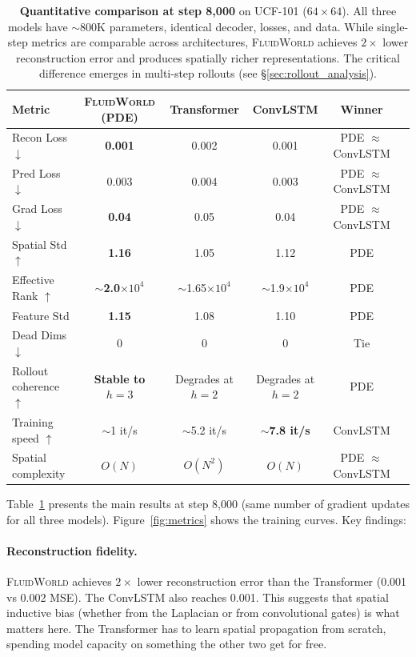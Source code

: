 \documentclass{article}
\newcommand{\fluidworld}{\textsc{FluidWorld}}
\begin{document}
\begin{table}[t]
    \centering
    \caption{\textbf{Quantitative comparison at step 8,000} on UCF-101 ($64\!\times\!64$). All three models have $\sim$800K parameters, identical decoder, losses, and data. While single-step metrics are comparable across architectures, \fluidworld{} achieves $2\times$ lower reconstruction error and produces spatially richer representations. The critical difference emerges in multi-step rollouts (see \S\ref{sec:rollout_analysis}).}
    \label{tab:results}
    \begin{tabular}{lccccc}
        \toprule
        \textbf{Metric} & \textbf{\fluidworld{} (PDE)} & \textbf{Transformer} & \textbf{ConvLSTM} & \textbf{Winner} \\
        \midrule
        Recon Loss $\downarrow$ & \textbf{0.001} & 0.002 & 0.001 & PDE $\approx$ ConvLSTM \\
        Pred Loss $\downarrow$ & 0.003 & 0.004 & 0.003 & PDE $\approx$ ConvLSTM \\
        Grad Loss $\downarrow$ & \textbf{0.04} & 0.05 & 0.04 & PDE $\approx$ ConvLSTM \\
        \midrule
        Spatial Std $\uparrow$ & \textbf{1.16} & 1.05 & 1.12 & PDE \\
        Effective Rank $\uparrow$ & \textbf{$\sim$2.0$\times 10^4$} & $\sim$1.65$\times 10^4$ & $\sim$1.9$\times 10^4$ & PDE \\
        Feature Std & \textbf{1.15} & 1.08 & 1.10 & PDE \\
        Dead Dims $\downarrow$ & 0 & 0 & 0 & Tie \\
        \midrule
        Rollout coherence $\uparrow$ & \textbf{Stable to $h\!=\!3$} & Degrades at $h\!=\!2$ & Degrades at $h\!=\!2$ & PDE \\
        \midrule
        Training speed $\uparrow$ & $\sim$1 it/s & $\sim$5.2 it/s & \textbf{$\sim$7.8 it/s} & ConvLSTM \\
        Spatial complexity & $O(N)$ & $O(N^2)$ & $O(N)$ & PDE $\approx$ ConvLSTM \\
        \bottomrule
    \end{tabular}
\end{table}

Table~\ref{tab:results} presents the main results at step 8,000 (same number of gradient updates for all three models). Figure~\ref{fig:metrics} shows the training curves. Key findings:

\paragraph{Reconstruction fidelity.} \fluidworld{} achieves $2\times$ lower reconstruction error than the Transformer (0.001 vs 0.002 MSE). The ConvLSTM also reaches 0.001. This suggests that spatial inductive bias (whether from the Laplacian or from convolutional gates) is what matters here. The Transformer has to learn spatial propagation from scratch, spending model capacity on something the other two get for free.
\end{document}
